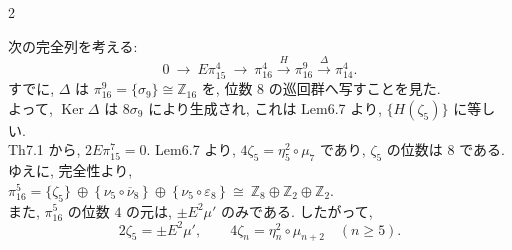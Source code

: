 \documentclass[10pt, leqno]{ltjsarticle}
\newcommand{\gen}[1]{\{#1\}}       %
\newcommand{\Ker}{\operatorname{Ker}}
\newcommand{\pit}[2]{\pi_{#1}^{#2}}
\numberwithin{equation}{section}
\theoremstyle{plain}
\theoremstyle{definition}
\theoremstyle{remark}
\begin{document}
\begin{paracol}{2}

次の完全列を考える:
\[
  0\ \longrightarrow\ E\pit{15}{4}\ \longrightarrow\ \pit{16}{4}
   \xrightarrow{\ H\ }\pit{16}{9}\xrightarrow{\ \Delta\ }\pit{14}{4}.
\]
すでに, \(\Delta\) は \(\pit{16}{9}=\gen{\sigma_{9}}\cong\mathbb Z_{16}\) を,
位数 \(8\) の巡回群へ写すことを見た.\\ 
よって, \(\Ker \Delta\) は \(8\sigma_{9}\) により生成され, これは Lem6.7 より,
\(\gen{H(\zeta_{5})}\) に等しい. \\
Th7.1 から, \(2E\pit{15}{7}=0\). 
Lem6.7 より, \(4\zeta_{5}=\eta_{5}^{2}\circ\mu_{7}\) であり, 
\(\zeta_{5}\) の位数は \(8\) である. \\
ゆえに, 完全性より,\\
\(
  \pit{16}{5}
   = \gen{\zeta_{5}}\ \oplus\ \gen{\,\nu_{5}\circ\overline{\nu}_{8}\,}\ \oplus\ \gen{\,\nu_{5}\circ\varepsilon_{8}\,}
   \ \cong\ \mathbb Z_{8}\oplus\mathbb Z_{2}\oplus\mathbb Z_{2}.
\)\\
また, \(\pit{16}{5}\) の位数 \(4\) の元は, \(\pm E^{2}\mu'\) のみである. したがって,
\begin{equation}\label{eq:714}
2\zeta_{5}=\pm E^{2}\mu',\qquad
4\zeta_{n}=\eta_{n}^{2}\circ\mu_{n+2}\quad(n\ge5).
\end{equation}


\end{paracol}
\end{document}
